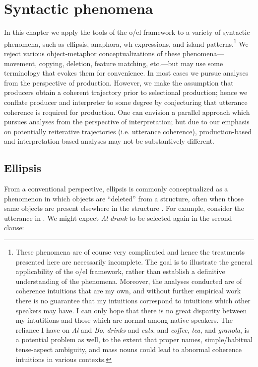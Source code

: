 \chapter{Syntactic phenomena}

In this chapter we apply the tools of the o/el framework to a variety of syntactic phenomena, such as ellipsis, anaphora, wh-expressions, and island patterns.\footnote{These phenomena are of course very complicated and hence the treatments presented here are necessarily incomplete. The goal is to illustrate the general applicability of the o/el framework, rather than establish a definitive understanding of the phenomena. Moreover, the analyses conducted are of coherence intuitions that are my own, and without further empirical work there is no guarantee that my intuitions correspond to intuitions which other speakers may have. I can only hope that there is no great disparity between my intutitions and those which are normal among native speakers. The reliance I have on \textit{Al} and \textit{Bo}, \textit{drinks} and \textit{eats}, and \textit{coffee}, \textit{tea}, and \textit{granola}, is a potential problem as well, to the extent that proper names, simple/habitual tense-aspect ambiguity, and mass nouns could lead to abnormal coherence intuitions in various contexts.} We reject various object-metaphor conceptualizations of these phenomena—movement, copying, deletion, feature matching, etc.—but may use some terminology that evokes them for convenience. In most cases we pursue analyses from the perspective of production. However, we make the assumption that producers obtain a coherent trajectory prior to selectional production; hence we conflate producer and interpreter to some degree by conjecturing that utterance coherence is required for production. One can envision a parallel approach which pursues analyses from the perspective of interpretation; but due to our emphasis on potentially reiterative trajectories (i.e. utterance coherence), production-based and interpretation-based analyses may not be substantively different. 

\section{Ellipsis}

From a conventional perspective, ellipsis is commonly conceptualized as a phenomenon in which objects are “deleted” from a structure, often when those same objects are present elsewhere in the structure \citep{Merchant2001,Merchant2005,Merchant2013}. For example, consider the utterance in . We might expect \textit{Al drank} to be selected again in the second clause:

